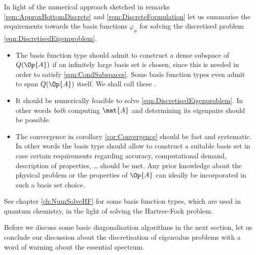 \begin{rem}
	\label{rem:ChoiceBasisFunction}
In light of the numerical approach sketched in
remarks \ref{rem:ApproxBottomDiscrete} and \ref{rem:DiscreteFormulation}
let us summarise the requirements towards the basis functions $\varphi_\mu$
for solving the discretised problem \eqref{eqn:DiscretisedEigenproblem}.
\begin{itemize}
	\item The basis function type should admit
		to construct a dense subspace of $Q(\Op{A})$
		if an infinitely large basis set is chosen,
		since this is needed in order to satisfy \eqref{eqn:CondSubspaces}.
		Some basis function types even admit to span $Q(\Op{A})$ itself.
		We shall call these .
	\item It should be numerically feasible to solve \eqref{eqn:DiscretisedEigenproblem}.
		In other words \emph{both} computing $\mat{A}$
		and determining its eigenpairs
		should be possible.
	\item The convergence in corollary \ref{cor:Convergence}
		should be fast and systematic.
		In other words the basis type should
		allow to construct a suitable basis set
		in case certain requirements
		regarding accuracy, computational demand,  description of properties, \ldots
		should be met.
		Any prior knowledge about the physical problem
		or the properties of $\Op{A}$ can ideally be incorporated
		in such a basis set choice.
\end{itemize}
See chapter \vref{ch:NumSolveHF} for some basis function types,
which are used in quantum chemistry,
in the light of solving the Hartree-Fock problem.
\end{rem}

Before we discuss some basic diagonalisation
algorithms in the next section,
let us conclude our discussion about the discretisation
of eigenvalue problems
with a word of warning about the essential spectrum.

